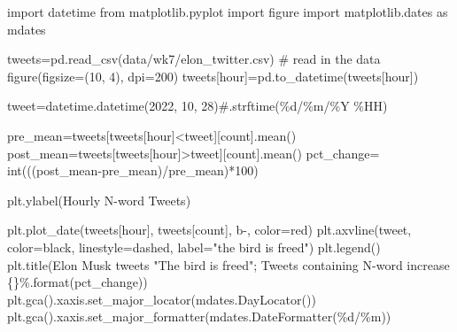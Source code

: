 \documentclass[
  letterpaper,
  DIV=11,
  numbers=noendperiod]{scrreprt}
\newenvironment{Shaded}{\begin{snugshade}}{\end{snugshade}}
\newcommand{\BuiltInTok}[1]{\textcolor[rgb]{0.00,0.23,0.31}{#1}}
\newcommand{\CommentTok}[1]{\textcolor[rgb]{0.37,0.37,0.37}{#1}}
\newcommand{\DecValTok}[1]{\textcolor[rgb]{0.68,0.00,0.00}{#1}}
\newcommand{\ImportTok}[1]{\textcolor[rgb]{0.00,0.46,0.62}{#1}}
\newcommand{\NormalTok}[1]{\textcolor[rgb]{0.00,0.23,0.31}{#1}}
\newcommand{\OperatorTok}[1]{\textcolor[rgb]{0.37,0.37,0.37}{#1}}
\newcommand{\SpecialCharTok}[1]{\textcolor[rgb]{0.37,0.37,0.37}{#1}}
\newcommand{\StringTok}[1]{\textcolor[rgb]{0.13,0.47,0.30}{#1}}
\begin{document}
\begin{Shaded}
\begin{Highlighting}[]
\ImportTok{import}\NormalTok{ datetime}
\ImportTok{from}\NormalTok{ matplotlib.pyplot }\ImportTok{import}\NormalTok{ figure}
\ImportTok{import}\NormalTok{ matplotlib.dates }\ImportTok{as}\NormalTok{ mdates}

\NormalTok{tweets}\OperatorTok{=}\NormalTok{pd.read\_csv(}\StringTok{\textquotesingle{}data/wk7/elon\_twitter.csv\textquotesingle{}}\NormalTok{) }\CommentTok{\# read in the data}
\NormalTok{figure(figsize}\OperatorTok{=}\NormalTok{(}\DecValTok{10}\NormalTok{, }\DecValTok{4}\NormalTok{), dpi}\OperatorTok{=}\DecValTok{200}\NormalTok{)}
\NormalTok{tweets[}\StringTok{\textquotesingle{}hour\textquotesingle{}}\NormalTok{]}\OperatorTok{=}\NormalTok{pd.to\_datetime(tweets[}\StringTok{\textquotesingle{}hour\textquotesingle{}}\NormalTok{])}

\NormalTok{tweet}\OperatorTok{=}\NormalTok{datetime.datetime(}\DecValTok{2022}\NormalTok{, }\DecValTok{10}\NormalTok{, }\DecValTok{28}\NormalTok{)}\CommentTok{\#.strftime(\textquotesingle{}\%d/\%m/\%Y \%HH\textquotesingle{})}

\NormalTok{pre\_mean}\OperatorTok{=}\NormalTok{tweets[tweets[}\StringTok{\textquotesingle{}hour\textquotesingle{}}\NormalTok{]}\OperatorTok{\textless{}}\NormalTok{tweet][}\StringTok{\textquotesingle{}count\textquotesingle{}}\NormalTok{].mean()}
\NormalTok{post\_mean}\OperatorTok{=}\NormalTok{tweets[tweets[}\StringTok{\textquotesingle{}hour\textquotesingle{}}\NormalTok{]}\OperatorTok{\textgreater{}}\NormalTok{tweet][}\StringTok{\textquotesingle{}count\textquotesingle{}}\NormalTok{].mean()}
\NormalTok{pct\_change}\OperatorTok{=} \BuiltInTok{int}\NormalTok{(((post\_mean}\OperatorTok{{-}}\NormalTok{pre\_mean)}\OperatorTok{/}\NormalTok{pre\_mean)}\OperatorTok{*}\DecValTok{100}\NormalTok{)}

\NormalTok{plt.ylabel(}\StringTok{\textquotesingle{}Hourly N{-}word Tweets\textquotesingle{}}\NormalTok{)}

\NormalTok{plt.plot\_date(tweets[}\StringTok{\textquotesingle{}hour\textquotesingle{}}\NormalTok{], tweets[}\StringTok{\textquotesingle{}count\textquotesingle{}}\NormalTok{], }\StringTok{\textquotesingle{}b{-}\textquotesingle{}}\NormalTok{, color}\OperatorTok{=}\StringTok{\textquotesingle{}red\textquotesingle{}}\NormalTok{)}
\NormalTok{plt.axvline(tweet, color}\OperatorTok{=}\StringTok{\textquotesingle{}black\textquotesingle{}}\NormalTok{, linestyle}\OperatorTok{=}\StringTok{\textquotesingle{}dashed\textquotesingle{}}\NormalTok{, label}\OperatorTok{=}\StringTok{\textquotesingle{}"the bird is freed"\textquotesingle{}}\NormalTok{)}
\NormalTok{plt.legend()}
\NormalTok{plt.title(}\StringTok{\textquotesingle{}Elon Musk tweets "The bird is freed"; Tweets containing N{-}word increase }\SpecialCharTok{\{\}}\StringTok{\%\textquotesingle{}}\NormalTok{.}\BuiltInTok{format}\NormalTok{(pct\_change))}
\NormalTok{plt.gca().xaxis.set\_major\_locator(mdates.DayLocator())}
\NormalTok{plt.gca().xaxis.set\_major\_formatter(mdates.DateFormatter(}\StringTok{\textquotesingle{}}\SpecialCharTok{\%d}\StringTok{/\%m\textquotesingle{}}\NormalTok{))}
\end{Highlighting}
\end{Shaded}
\end{document}

